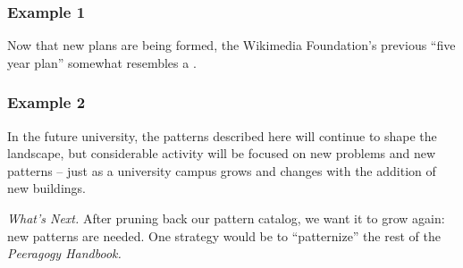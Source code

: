 \subsubsection*{Example 1} Now that new plans are being formed, the Wikimedia Foundation's previous ``five year plan'' somewhat
resembles a  \cite{wikimedia2011plan}.

\subsubsection*{Example 2} 
In the future university, the patterns described here will continue to
shape the landscape, but considerable activity will be focused on new
problems and new patterns -- just as a university campus grows and
changes with the addition of new buildings.

\begin{framed}
\noindent 
\emph{What's Next.}
After pruning back our pattern catalog, we want it to grow again: new patterns are needed.
One strategy would be to ``patternize'' the rest of the \emph{Peeragogy Handbook.}
\end{framed}


